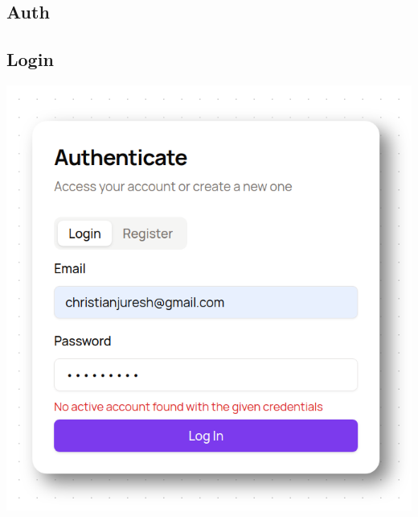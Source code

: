 \begin{appendices}
\section{Auth} \label{app:Auth}
\begin{center}
\subsection{Login}
\includegraphics[width=0.35\textheight]{images/login.png}


\end{center}
\end{appendices}
